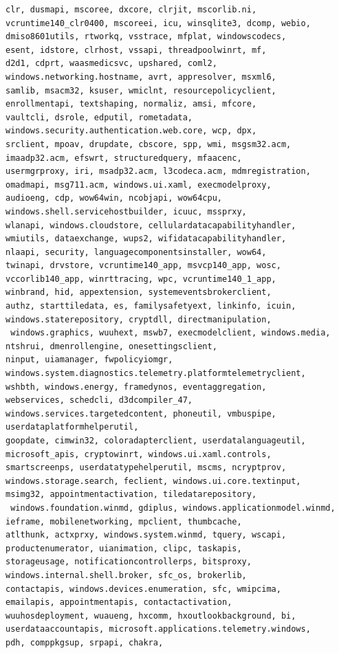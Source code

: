\documentclass[a4paper,twoside,12pt]{book}
\begin{document}
\begin{appendices}
\begin{lstlisting}[label={lst:dlls},caption={All gathered DLL's},escapeinside=``,basicstyle=\tiny,breaklines=true]
clr, dusmapi, mscoree, dxcore, clrjit, mscorlib.ni, 
vcruntime140_clr0400, mscoreei, icu, winsqlite3, dcomp, webio, 
dmiso8601utils, rtworkq, vsstrace, mfplat, windowscodecs, 
esent, idstore, clrhost, vssapi, threadpoolwinrt, mf, 
d2d1, cdprt, waasmedicsvc, upshared, coml2, 
windows.networking.hostname, avrt, appresolver, msxml6, 
samlib, msacm32, ksuser, wmiclnt, resourcepolicyclient, 
enrollmentapi, textshaping, normaliz, amsi, mfcore, 
vaultcli, dsrole, edputil, rometadata, 
windows.security.authentication.web.core, wcp, dpx, 
srclient, mpoav, drupdate, cbscore, spp, wmi, msgsm32.acm, 
imaadp32.acm, efswrt, structuredquery, mfaacenc, 
usermgrproxy, iri, msadp32.acm, l3codeca.acm, mdmregistration, 
omadmapi, msg711.acm, windows.ui.xaml, execmodelproxy, 
audioeng, cdp, wow64win, ncobjapi, wow64cpu, 
windows.shell.servicehostbuilder, icuuc, mssprxy, 
wlanapi, windows.cloudstore, cellulardatacapabilityhandler, 
wmiutils, dataexchange, wups2, wifidatacapabilityhandler, 
nlaapi, security, languagecomponentsinstaller, wow64, 
twinapi, drvstore, vcruntime140_app, msvcp140_app, wosc, 
vccorlib140_app, winrttracing, wpc, vcruntime140_1_app, 
winbrand, hid, appextension, systemeventsbrokerclient, 
authz, starttiledata, es, familysafetyext, linkinfo, icuin, 
windows.staterepository, cryptdll, directmanipulation,
 windows.graphics, wuuhext, mswb7, execmodelclient, windows.media, 
ntshrui, dmenrollengine, onesettingsclient, 
ninput, uiamanager, fwpolicyiomgr, 
windows.system.diagnostics.telemetry.platformtelemetryclient, 
wshbth, windows.energy, framedynos, eventaggregation, 
webservices, schedcli, d3dcompiler_47, 
windows.services.targetedcontent, phoneutil, vmbuspipe, 
userdataplatformhelperutil, 
goopdate, cimwin32, coloradapterclient, userdatalanguageutil, 
microsoft_apis, cryptowinrt, windows.ui.xaml.controls, 
smartscreenps, userdatatypehelperutil, mscms, ncryptprov, 
windows.storage.search, feclient, windows.ui.core.textinput, 
msimg32, appointmentactivation, tiledatarepository,
 windows.foundation.winmd, gdiplus, windows.applicationmodel.winmd, 
ieframe, mobilenetworking, mpclient, thumbcache, 
atlthunk, actxprxy, windows.system.winmd, tquery, wscapi, 
productenumerator, uianimation, clipc, taskapis, 
storageusage, notificationcontrollerps, bitsproxy, 
windows.internal.shell.broker, sfc_os, brokerlib, 
contactapis, windows.devices.enumeration, sfc, wmipcima, 
emailapis, appointmentapis, contactactivation, 
wuuhosdeployment, wuaueng, hxcomm, hxoutlookbackground, bi, 
userdataaccountapis, microsoft.applications.telemetry.windows, 
pdh, comppkgsup, srpapi, chakra, 

\end{lstlisting}
\end{appendices}
\end{document}
